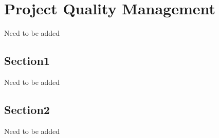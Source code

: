 \chapter{Project Quality Management}
Need to be added
\section{Section1}
Need to be added
\section{Section2}
Need to be added